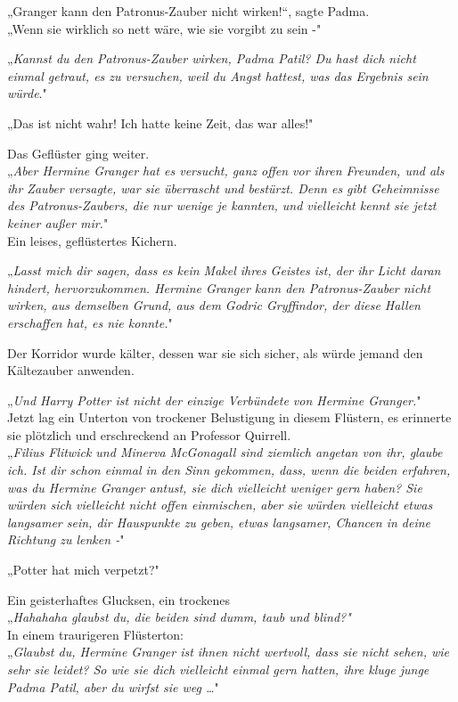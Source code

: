 {„Granger kann den Patronus-Zauber nicht wirken!“, sagte Padma.\\ „Wenn sie wirklich so nett wäre, wie sie vorgibt zu sein -"

„\emph{Kannst du den Patronus-Zauber wirken, Padma Patil? Du hast dich nicht einmal getraut, es zu versuchen, weil du Angst hattest, was das Ergebnis sein würde}."

„Das ist nicht wahr! Ich hatte keine Zeit, das war alles!"

Das Geflüster ging weiter.\\ „\emph{Aber Hermine Granger hat es versucht, ganz offen vor ihren Freunden, und als ihr Zauber versagte, war sie überrascht und bestürzt. Denn es gibt Geheimnisse des Patronus-Zaubers, die nur wenige je kannten, und vielleicht kennt sie jetzt keiner außer mir.}"\\ Ein leises, geflüstertes Kichern.

„\emph{Lasst mich dir sagen, dass es kein Makel ihres Geistes ist, der ihr Licht daran hindert, hervorzukommen. Hermine Granger kann den Patronus-Zauber nicht wirken, aus demselben Grund, aus dem Godric Gryffindor, der diese Hallen erschaffen hat, es nie konnte.}"

Der Korridor wurde kälter, dessen war sie sich sicher, als würde jemand den Kältezauber anwenden.

„\emph{Und Harry Potter ist nicht der einzige Verbündete von Hermine Granger.}"\\ Jetzt lag ein Unterton von trockener Belustigung in diesem Flüstern, es erinnerte sie plötzlich und erschreckend an Professor Quirrell.\\ „\emph{Filius Flitwick und Minerva McGonagall sind ziemlich angetan von ihr, glaube ich. Ist dir schon einmal in den Sinn gekommen, dass, wenn die beiden erfahren, was du Hermine Granger antust, sie dich vielleicht weniger gern haben? Sie würden sich vielleicht nicht offen einmischen, aber sie würden vielleicht etwas langsamer sein, dir Hauspunkte zu geben, etwas langsamer, Chancen in deine Richtung zu lenken -}"

„Potter hat mich verpetzt?"

Ein geisterhaftes Glucksen, ein trockenes\\ „\emph{Hahahaha glaubst du, die beiden sind dumm, taub und blind?"}\\ In einem traurigeren Flüsterton:\\ „\emph{Glaubst du, Hermine Granger ist ihnen nicht wertvoll, dass sie nicht sehen, wie sehr sie leidet? So wie sie dich vielleicht einmal gern hatten, ihre kluge junge Padma Patil, aber du wirfst sie weg …}"

}
